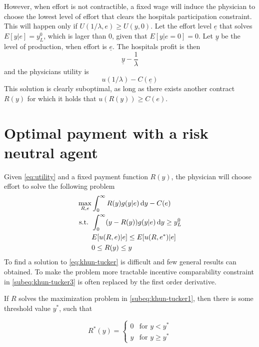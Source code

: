 However, when effort is not contractible, a fixed wage will induce the physician to choose the lowest level of effort that clears the hospitals participation constraint. This will happen only if $U(1/\lambda,e)\geq U(y,0)$. Let the effort level  $\underline{e}$ that solves $E[y|e]=y^0_L$, which is lager than $0$, given that $E[y|e=0]=0$. Let $\underline{y}$ be the level of production, when effort is $\underline{e}$. The hospitals profit is then 
\[
 \underline{y}-\frac{1}{\lambda}
\]
and the physicians utility is 
\[
 u\left(1\big/\lambda\right)-C(\underline{e})
\]
This solution is clearly suboptimal, as long as there exists another contract $R(y)$ for which it holds that $u(R(y))\geq C(e)$.

\section{Optimal payment with a risk neutral agent} %
\label{sec:optimal_payment_with_a_risk_neutral_agent}




Given \cref{eq:utility} and a fixed payment function $R(y)$, the physician will choose effort to solve the following problem
\begin{subequations}
\label{eq:khun-tucker}
\begin{align}
    \max_{R,e} & \int_0^{\infty}R(y)g(y|e)\dif y-C(e)\label{subeq:khun-tucker1} \\
    \text{s.t. }    & \int_{0}^{\infty} (y-R(y))g(y|e)\dif y\geq y_L^0 \label{subeq:khun-tucker2} \\
                    & E[u(R,e)|e]\leq E[u(R,e^*)|e] \label{subeq:khun-tucker3}\\
                    & 0\leq R(y)\leq y \label{subeq:khun-tucker4}
\end{align}
\end{subequations}
To find a solution to \cref{eq:khun-tucker} is difficult and few general results can obtained. To make the problem more tractable incentive comparability constraint in \cref{subeq:khun-tucker3} is often replaced by the first order derivative. 

\begin{proposition}
\label{prop:payment-function}
If $R$ solves the maximization problem in \cref{subeq:khun-tucker1}, then there is some threshold value $y^*$, such that 

\[
    R^*(y)=\begin{cases}
                0 & \text{for } y< y^* \\
                y & \text{for } y\geq y^*
            \end{cases}            
\]
\end{proposition}

